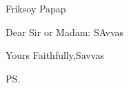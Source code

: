 \documentclass{letter}
\begin{document}
\begin{letter}{Friksoy Papap}
\opening{Dear Sir or Madam: SAvvas}




\closing{Yours Faithfully,Savvas}
\ps



\end{letter}
\end{document}
